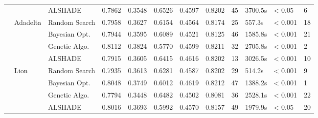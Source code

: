 \documentclass[conference]{IEEEtran}
\begin{document}
\begin{table}[t]
\begin{tabular}{llllllllllll}
 &  & ALSHADE & 0.7862 & 0.3548 & 0.6526 & 0.4597 & 0.8202 & 45 & 3700.5s & < 0.05 & 6 \\
\cline{2-12}
 & \multirow{4}{*}{ Adadelta} & Random Search & 0.7958 & 0.3627 & 0.6154 & 0.4564 & 0.8174 & 25 & 557.3s & < 0.001 & 18 \\
 &  & Bayesian Opt. & 0.7944 & 0.3595 & 0.6089 & 0.4521 & 0.8125 & 46 & 1585.8s & < 0.001 & 21 \\
 &  & Genetic Algo. & 0.8112 & 0.3824 & 0.5770 & 0.4599 & 0.8211 & 32 & 2705.8s & < 0.001 & 2 \\
 &  & ALSHADE & 0.7915 & 0.3605 & 0.6415 & 0.4616 & 0.8202 & 13 & 3026.5s & < 0.001 & 10 \\
\cline{2-12}
 & \multirow{4}{*}{ Lion} & Random Search & 0.7935 & 0.3613 & 0.6281 & 0.4587 & 0.8202 & 29 & 514.2s & < 0.001 & 9 \\
 &  & Bayesian Opt. & 0.8048 & 0.3749 & 0.6012 & 0.4619 & 0.8212 & 47 & 1388.2s & < 0.001 & 1 \\
 &  & Genetic Algo. & 0.7794 & 0.3448 & 0.6482 & 0.4502 & 0.8081 & 36 & 2528.1s & < 0.001 & 22 \\
 &  & ALSHADE & 0.8016 & 0.3693 & 0.5992 & 0.4570 & 0.8157 & 49 & 1979.9s & < 0.05 & 20 \\
\bottomrule
\end{tabular}
\end{table}
\end{document}
